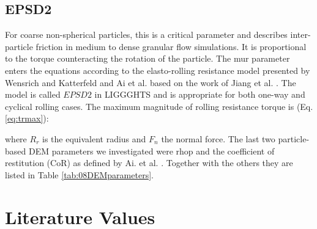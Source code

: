 \subsection{EPSD2}
\label{subsec:epsd2}

For coarse non-spherical particles, this is a critical parameter and describes
inter-particle friction in medium to dense granular flow simulations. It is proportional to the 
torque counteracting the rotation of the particle. The \acs{mur} parameter enters the 
equations according to the elasto-rolling resistance model presented by Wensrich and 
Katterfeld \cite{RefWorks:87} and Ai et al. \cite{RefWorks:131} 
based on the work of Jiang et al. \cite{RefWorks:143}. 
The model is called $EPSD2$ in \acs{LIGGGHTS} and is appropriate for both one-way and cyclical rolling cases.
The maximum magnitude of rolling resistance torque is (Eq. \ref{eq:trmax}):



where $R_r$ is the equivalent radius and $F_n$ the normal force.
The last two particle-based \acs{DEM} parameters we investigated were \acs{rhop}
and the coefficient of restitution (\acs{CoR}) as defined by Ai. et al.
\cite{RefWorks:131}.
Together with the others they are listed in Table \ref{tab:08DEMparameters}.\\



\section{Literature Values}
\label{sec:literaturevalues}

